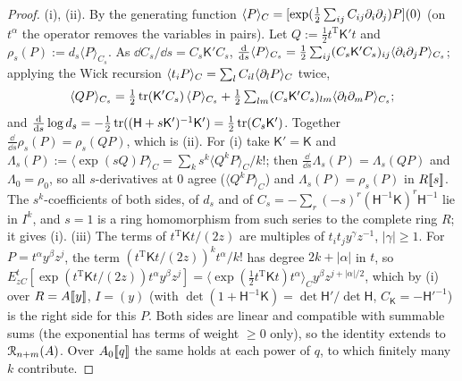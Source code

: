 \begin{proof}
(i), (ii). By the generating function $\langle P\rangle_C=[\exp(\frac12\sum_{ij}C_{ij}\partial_i\partial_j)P](0)$ (on $t^\alpha$ the operator removes the variables in pairs). Let $Q:=\frac12t^{\mathrm T}\mathsf K't$ and $\rho_s(P):=d_s\langle P\rangle_{C_s}$. As $\dd C_s/\dd s=C_s\mathsf K'C_s$, $\frac{\mathrm{d}}{\mathrm{d} s}\langle P\rangle_{C_s}=\frac12\sum_{ij}(C_s\mathsf K'C_s)_{ij}\langle\partial_i\partial_jP\rangle_{C_s}$; applying the Wick recursion $\langle t_iP\rangle_C=\sum_lC_{il}\langle\partial_lP\rangle_C$ twice,
\[
\langle QP\rangle_{C_s}=\tfrac12\operatorname{tr}(\mathsf K'C_s)\,\langle P\rangle_{C_s}+\tfrac12\textstyle\sum_{lm}(C_s\mathsf K'C_s)_{lm}\langle\partial_l\partial_mP\rangle_{C_s};
\]
and $\frac{\mathrm{d}}{\mathrm{d} s}\log d_s=-\frac12\operatorname{tr}((\mathsf H+s\mathsf K')^{-1}\mathsf K')=\frac12\operatorname{tr}(C_s\mathsf K')$. Together $\frac{\dd}{\dd s}\rho_s(P)=\rho_s(QP)$, which is (ii). For (i) take $\mathsf K'=\mathsf K$ and $\Lambda_s(P):=\langle\exp(sQ)P\rangle_C=\sum_ks^k\langle Q^kP\rangle_C/k!$; then $\frac{\dd}{\dd s}\Lambda_s(P)=\Lambda_s(QP)$ and $\Lambda_0=\rho_0$, so all $s$-derivatives at $0$ agree ($\langle Q^kP\rangle_C$) and $\Lambda_s(P)=\rho_s(P)$ in $R[\![ s ]\!]$. The $s^k$-coefficients of both sides, of $d_s$ and of $C_s=-\sum_r(-s)^r(\mathsf H^{-1}\mathsf K)^r\mathsf H^{-1}$ lie in $I^k$, and $s=1$ is a ring homomorphism from such series to the complete ring $R$; it gives (i).
(iii) The terms of $t^{\mathrm T}\mathsf Kt/(2z)$ are multiples of $t_it_jy^\gamma z^{-1}$, $|\gamma|\geq1$. For $P=t^\alpha y^\beta z^j$, the term $(t^{\mathrm T}\mathsf Kt/(2z))^kt^\alpha/k!$ has degree $2k+|\alpha|$ in $t$, so $E^t_{zC}[\exp(t^{\mathrm T}\mathsf Kt/(2z))t^\alpha y^\beta z^j]=\langle\exp(\frac12t^{\mathrm T}\mathsf Kt)t^\alpha\rangle_Cy^\beta z^{j+|\alpha|/2}$, which by (i) over $R=A[\![ y ]\!]$, $I=(y)$ (with $\det(1+\mathsf H^{-1}\mathsf K)=\det\mathsf H'/\det\mathsf H$, $C_{\mathsf K}=-\mathsf H'^{-1}$) is the right side for this $P$. Both sides are linear and compatible with summable sums (the exponential has terms of weight $\geq0$ only), so the identity extends to $\mathcal{R}_{n+m}(A)$. Over $A_0[\![ q ]\!]$ the same holds at each power of $q$, to which finitely many $k$ contribute.
\end{proof}

